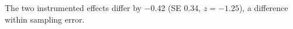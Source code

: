 The two instrumented effects differ by $-$0.42 (SE 0.34, $z = -1.25$), a difference within sampling error.%

